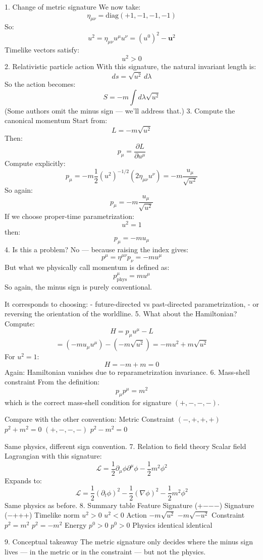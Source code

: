 1. Change of metric signature
We now take:
\[
\eta_{\mu\nu} = \mathrm{diag}(+1, -1, -1, -1)
\]
So:
\[
u^2 = \eta_{\mu\nu} u^\mu u^\nu = (u^0)^2 - \mathbf{u}^2
\]
Timelike vectors satisfy:
\[
u^2 > 0
\]
2. Relativistic particle action
With this signature, the natural invariant length is:
\[
ds = \sqrt{u^2}\, d\lambda
\]
So the action becomes:
\[
S = -m \int d\lambda \sqrt{u^2}
\]
(Some authors omit the minus sign — we’ll address that.)
3. Compute the canonical momentum
Start from:
\[
L = -m \sqrt{u^2}
\]
Then:
\[
p_\mu = \frac{\partial L}{\partial u^\mu}
\]
Compute explicitly:
\[
p_\mu
= -m \frac{1}{2} (u^2)^{-1/2} (2 \eta_{\mu\nu} u^\nu)
= -m \frac{u_\mu}{\sqrt{u^2}}
\]
So again:
\[
p_\mu = -m \frac{u_\mu}{\sqrt{u^2}}
\]
If we choose proper-time parametrization:
\[
u^2 = 1
\]
then:
\[
p_\mu = -m u_\mu
\]
4. Is this a problem?
No — because raising the index gives:
\[
p^\mu = \eta^{\mu\nu} p_\nu = -m u^\mu
\]
But what we physically call momentum is defined as:
\[
p^\mu_{\text{phys}} = m u^\mu
\]
So again, the minus sign is purely conventional.

It corresponds to choosing:
- future-directed vs past-directed parametrization,
- or reversing the orientation of the worldline.
5. What about the Hamiltonian?
Compute:
\[
H = p_\mu u^\mu - L
\]
\[
= (-m u_\mu u^\mu) - (-m \sqrt{u^2})
= -m u^2 + m \sqrt{u^2}
\]
For \(u^2 = 1\):
\[
H = -m + m = 0
\]
Again: Hamiltonian vanishes due to reparametrization invariance.
6. Mass-shell constraint
From the definition:
\[
p_\mu p^\mu = m^2
\]
which is the correct mass-shell condition for signature \((+,-,-,-)\).

Compare with the other convention:
Metric	Constraint
\((-,+,+,+)\)	\(p^2 + m^2 = 0\)
\((+,-,-,-)\)	\(p^2 - m^2 = 0\)


Same physics, different sign convention.
7. Relation to field theory
Scalar field Lagrangian with this signature:
\[
\mathcal{L}
= \frac{1}{2} \partial_\mu \phi \partial^\mu \phi - \frac{1}{2} m^2 \phi^2
\]
Expands to:
\[
\mathcal{L}
= \frac{1}{2} (\partial_t \phi)^2
- \frac{1}{2} (\nabla \phi)^2
- \frac{1}{2} m^2 \phi^2
\]
Same physics as before.
8. Summary table
Feature	Signature (+−−−)	Signature (−+++)
Timelike norm	\(u^2 > 0\)	\(u^2 < 0\)
Action	\(-m\sqrt{u^2}\)	\(-m\sqrt{-u^2}\)
Constraint	\(p^2 = m^2\)	\(p^2 = -m^2\)
Energy	\(p^0 > 0\)	\(p^0 > 0\)
Physics	identical	identical


9. Conceptual takeaway
The metric signature only decides where the minus sign lives — in the metric or in the constraint — but not the physics.

